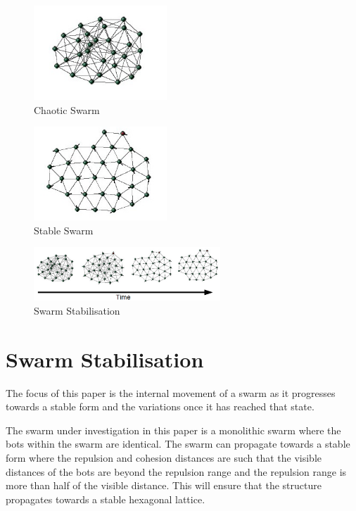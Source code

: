 \documentclass[10pt,journal,letterpaper,twoside]{IEEEtran}
\newcommand{\stability}{internal movement}
\begin{document}
\begin{figure}[H]
\begin{center}
\includegraphics[width=5cm]{figures/Chaos}
\end{center}
\caption{Chaotic Swarm\label{methods:Chaos1}}
\end{figure}
\begin{figure}[H]
\begin{center}
\includegraphics[width=5cm]{figures/Stable}
\end{center}
\caption{Stable Swarm\label{methods:Stable1}}
\end{figure}
\begin{figure}[H]
\begin{center}
\includegraphics[width=7cm]{figures/StableTime}
\end{center}
\caption{Swarm Stabilisation\label{methods:StableTime1}}
\end{figure}

\section{Swarm Stabilisation\label{section:swarmStabilisation}}
The focus of this paper is the \stability{} of a swarm as it
progresses towards a stable form and the variations once it has
reached that state.

The swarm under investigation in this paper is a monolithic swarm
where the bots within the swarm are identical. The swarm can propagate
towards a stable form where the repulsion and cohesion distances are
such that the visible distances of the bots are beyond the repulsion
range and the repulsion range is more than half of the visible
distance. This will ensure that the structure propagates towards a
stable hexagonal lattice.
\end{document}
